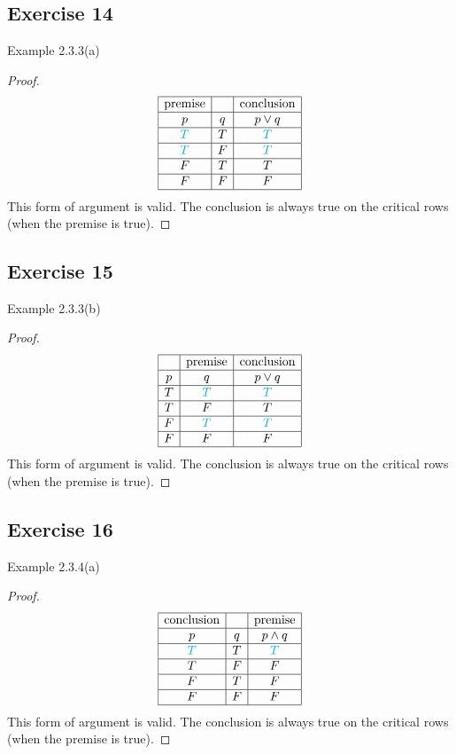 \documentclass[14pt]{extarticle}
\begin{document}
\subsection{Exercise 14}
Example 2.3.3(a)

\begin{proof}
$$
\begin{array}{|c|c|c|}
\hline
\text{premise} & & \text{conclusion}\\
\hline
p & q & p \vee q \\
\hline
\color{cyan} T & T & \color{cyan} T \\
\hline
\color{cyan} T & F & \color{cyan} T \\
\hline
F & T & T \\
\hline
F & F & F \\
\hline
\end{array}
$$
This form of argument is valid. The conclusion is always true on the critical
rows (when the premise is true).
\end{proof}

\subsection{Exercise 15}
Example 2.3.3(b)

\begin{proof}
$$
\begin{array}{|c|c|c|}
\hline
 & \text{premise} & \text{conclusion}\\
\hline
p & q & p \vee q \\
\hline
T & \color{cyan} T & \color{cyan} T \\
\hline
T & F & T \\
\hline
F & \color{cyan} T & \color{cyan} T \\
\hline
F & F & F \\
\hline
\end{array}
$$
This form of argument is valid. The conclusion is always true on the critical
rows (when the premise is true).
\end{proof}

\subsection{Exercise 16}
Example 2.3.4(a)

\begin{proof}
$$
\begin{array}{|c|c|c|}
\hline
\text{conclusion} & & \text{premise} \\
\hline
p & q & p \wedge q \\
\hline
\color{cyan} T & T & \color{cyan} T \\
\hline
T & F & F \\
\hline
F & T & F \\
\hline
F & F & F \\
\hline
\end{array}
$$
This form of argument is valid. The conclusion is always true on the critical
rows (when the premise is true).
\end{proof}
\end{document}
